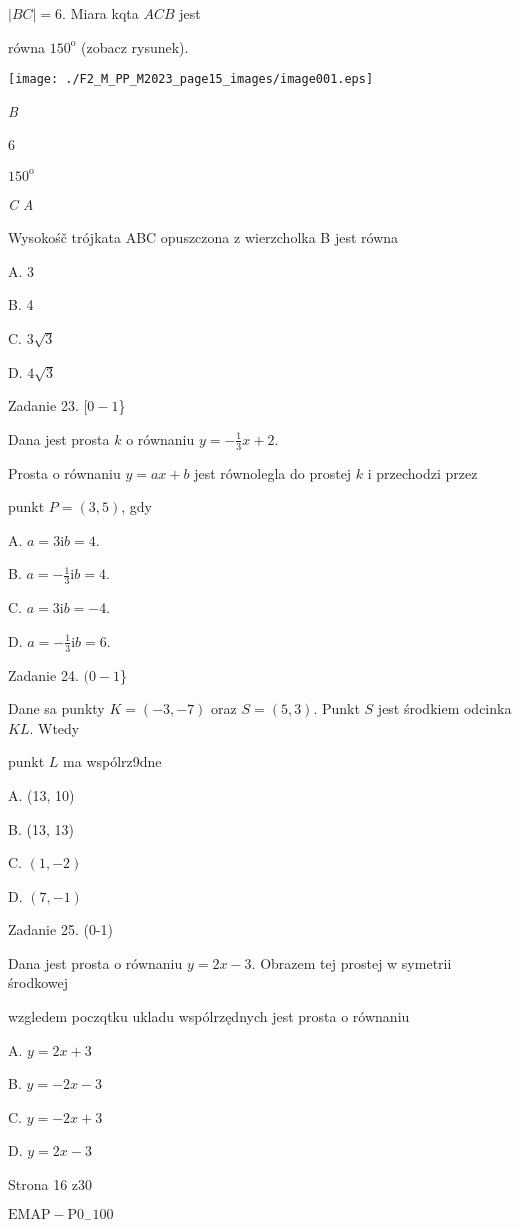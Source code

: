 \documentclass[a4paper,12pt]{article}
\begin{document}
$|BC|=6$. Miara kqta $ACB$ jest

równa $150^{\mathrm{o}}$ (zobacz rysunek).
\begin{center}
\texttt{[image: ./F2\_M\_PP\_M2023\_page15\_images/image001.eps]}
\end{center}
{\it B}

6

$150^{\mathrm{o}}$

{\it C  A}

Wysokośč trójkata ABC opuszczona z wierzcholka B jest równa

A. 3

B. 4

C. $3\sqrt{3}$

D. $4\sqrt{3}$

Zadanie 23. $[0-1$\}

Dana jest prosta $k$ o równaniu $y=-\displaystyle \frac{1}{3}x+2.$

Prosta o równaniu $y=ax+b$ jest równolegla do prostej $k$ i przechodzi przez

punkt $P=(3,5)$, gdy

A. $a=3 \mathrm{i} b=4.$

B. $a=-\displaystyle \frac{1}{3} \mathrm{i} b=4.$

C. $a=3 \mathrm{i} b=-4.$

D. $a=-\displaystyle \frac{1}{3} \mathrm{i} b=6.$

Zadanie 24. $(0-1$\}

Dane sa punkty $K=(-3,-7)$ oraz $S=(5,3)$. Punkt $S$ jest środkiem odcinka $KL$. Wtedy

punkt $L$ ma wspólrz9dne

A. (13, 10)

B. (13, 13)

C. $(1,-2)$

D. $(7,-1)$

Zadanie 25. (0-1)

Dana jest prosta o równaniu $y=2x-3$. Obrazem tej prostej w symetrii środkowej

wzgledem poczqtku ukladu wspólrzędnych jest prosta o równaniu

A. $y=2x+3$

B. $y=-2x-3$

C. $y=-2x+3$

D. $y=2x-3$

Strona 16 z30

$\mathrm{E}\mathrm{M}\mathrm{A}\mathrm{P}-\mathrm{P}0_{-}100$
\end{document}
